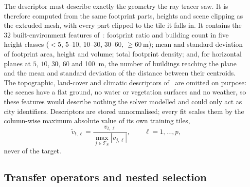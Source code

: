 The descriptor must describe exactly the geometry the ray tracer saw. It is
therefore computed from the same footprint parts, heights and scene clipping
as the extruded mesh, with every part clipped to the tile it falls in. It
contains the $32$ built-environment features of~\cite{ozyurt2026}: footprint
ratio and building count in five height classes ($<5$, $5$--$10$,
$10$--$30$, $30$--$60$, $\ge\SI{60}{\metre}$); mean and standard deviation of
footprint area, height and volume; total footprint density; and, for
horizontal planes at $5$, $10$, $30$, $60$ and \SI{100}{\metre}, the number
of buildings reaching the plane and the mean and standard deviation of the
distance between their centroids. The topographic, land-cover and climatic
descriptors of~\cite{ozyurt2026} are omitted on purpose: the scenes have a
flat ground, no water or vegetation surfaces and no weather, so these
features would describe nothing the solver modelled and could only act as
city identifiers. Descriptors are stored unnormalised; every fit scales
them by the column-wise maximum absolute value of its own training tiles,
\begin{equation}
\tilde v_{t,\ell}=\frac{v_{t,\ell}}{\max_{j\in\mathcal{T}_{\mathrm{S}}}|v_{j,\ell}|},
\qquad \ell=1,\dots,p,
\label{eq:scale}
\end{equation}
never of the target.

\subsection{Transfer operators and nested selection}
\label{sec:operators}

